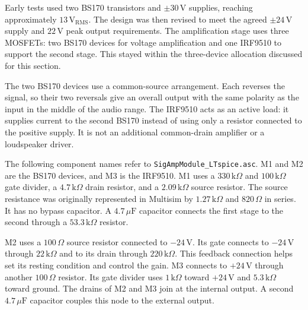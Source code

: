 \documentclass[conference]{IEEEtran}
\begin{document}
Early tests used two BS170 transistors and $\pm30\,\mathrm{V}$ supplies, reaching approximately $13\,\mathrm{V_{RMS}}$. The design was then revised to meet the agreed $\pm24\,\mathrm{V}$ supply and $22\,\mathrm{V}$ peak output requirements. The amplification stage uses three MOSFETs: two BS170 devices for voltage amplification and one IRF9510 to support the second stage. This stayed within the three-device allocation discussed for this section.

The two BS170 devices use a common-source arrangement. Each reverses the signal, so their two reversals give an overall output with the same polarity as the input in the middle of the audio range. The IRF9510 acts as an active load: it supplies current to the second BS170 instead of using only a resistor connected to the positive supply. It is not an additional common-drain amplifier or a loudspeaker driver.

The following component names refer to \texttt{SigAmpModule\_LTspice.asc}. M1 and M2 are the BS170 devices, and M3 is the IRF9510. M1 uses a $330\,\mathrm{k}\Omega$ and $100\,\mathrm{k}\Omega$ gate divider, a $4.7\,\mathrm{k}\Omega$ drain resistor, and a $2.09\,\mathrm{k}\Omega$ source resistor. The source resistance was originally represented in Multisim by $1.27\,\mathrm{k}\Omega$ and $820\,\Omega$ in series. It has no bypass capacitor. A $4.7\,\mu\mathrm{F}$ capacitor connects the first stage to the second through a $53.3\,\mathrm{k}\Omega$ resistor.

M2 uses a $100\,\Omega$ source resistor connected to $-24\,\mathrm{V}$. Its gate connects to $-24\,\mathrm{V}$ through $22\,\mathrm{k}\Omega$ and to its drain through $220\,\mathrm{k}\Omega$. This feedback connection helps set its resting condition and control the gain. M3 connects to $+24\,\mathrm{V}$ through another $100\,\Omega$ resistor. Its gate divider uses $1\,\mathrm{k}\Omega$ toward $+24\,\mathrm{V}$ and $5.3\,\mathrm{k}\Omega$ toward ground. The drains of M2 and M3 join at the internal output. A second $4.7\,\mu\mathrm{F}$ capacitor couples this node to the external output.
\end{document}

